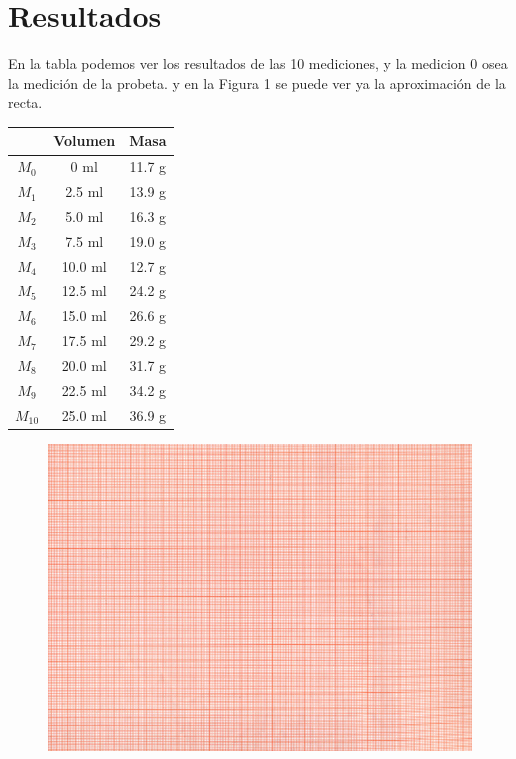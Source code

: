 \documentclass[12pt,a4paper]{article}
\begin{document}
\section{Resultados}

En la tabla podemos ver los resultados de las 10 mediciones, y la medicion 0 osea la medición de la probeta. y en la Figura 1 se puede ver ya la aproximación de la recta.\\


\begin{table}[h]
\begin{center}
\begin{tabular}{|c|c|c|}
\hline
& Volumen & Masa\\\hline
$M_0$ & 0 ml & 11.7 g\\\hline
$M_1$ & 2.5 ml & 13.9 g\\\hline
$M_2$ & 5.0 ml & 16.3 g\\\hline
$M_3$ & 7.5 ml & 19.0 g\\\hline
$M_4$ & 10.0 ml & 12.7 g\\\hline
$M_5$ & 12.5 ml & 24.2 g\\\hline
$M_6$ & 15.0 ml & 26.6 g\\\hline
$M_7$ & 17.5 ml & 29.2 g\\\hline
$M_8$ & 20.0 ml & 31.7 g\\\hline
$M_9$ & 22.5 ml & 34.2 g\\\hline
$M_10$ & 25.0 ml & 36.9 g\\
\hline
\end{tabular}
\end{center}
\end{table}

\begin{figure}[h!]
\centering
\includegraphics[scale=1]{1.jpg}
\caption{}
\end{figure}
\end{document}

